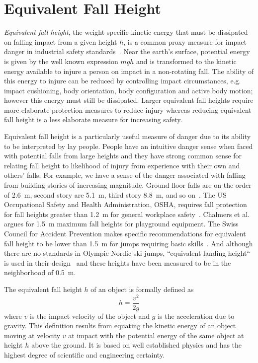 \documentclass[smallextended]{svjour3}       %
\begin{document}
\section{Equivalent Fall Height}
\label{sec:efh}
%
\emph{Equivalent fall height}, the weight specific kinetic energy that must be dissipated on falling 
impact from a given height $h$, is a common proxy measure for impact danger in
industrial safety standards~\cite{Hubbard2012}.  Near the earth's surface, potential
energy is given by the well known expression $mgh$ and is transformed to the kinetic
energy available to injure a person on impact in a non-rotating fall. The ability of this energy to injure can be reduced by controlling impact circumstances, e.g.
impact cushioning, body orientation, body configuration and active body motion;
however this energy must still be dissipated. Larger equivalent fall heights
require more elaborate protection measures to reduce injury whereas reducing
equivalent fall height is a less elaborate measure for increasing safety.

Equivalent fall height is a particularly useful measure of danger due to its
ability to be interpreted by lay people. People have an intuitive danger sense when
faced with potential falls from large heights and they have strong common sense
for relating fall height to likelihood of injury from experience with their
own and others' falls. For example, we have a sense of the danger associated
with falling from building stories of increasing magnitude. Ground floor falls
are on the order of 2.6~\si{\meter}, second story are 5.1~\si{\meter}, third
story 8.8~\si{\meter}, and so on~\cite{Vish2005}. The US Occupational Safety
and Health Administration, OSHA, requires fall protection for fall heights
greater than 1.2~\si{\meter} for general workplace safety~\cite{OSHA2021}.
Chalmers et al.~\cite{Chalmers1996} argues for 1.5~\si{\meter} maximum fall
heights for playground equipment. The Swiss Council for Accident Prevention
makes specific recommendations for equivalent fall height to be lower than
1.5~\si{\meter} for jumps requiring basic skills~\cite{Heer2019}. And although
there are no standards in Olympic Nordic ski jumps, ``equivalent landing
height`` is used in their design~\cite{Gasser2018} and these heights have been
measured to be in the neighborhood of 0.5~\si{\meter}.

The equivalent fall height $h$ of an object is formally defined as
%
\begin{equation} h = \frac{v^2}{2g} \label{eq:efh_general} \end{equation}
%
where $v$ is the impact velocity of the object and $g$ is the acceleration due
to gravity. This definition results from equating the kinetic energy of an
object moving at velocity $v$ at impact with the potential energy of the same
object at height $h$ above the ground. It is based on well established physics and has the highest degree of scientific and engineering certainty.
\end{document}
